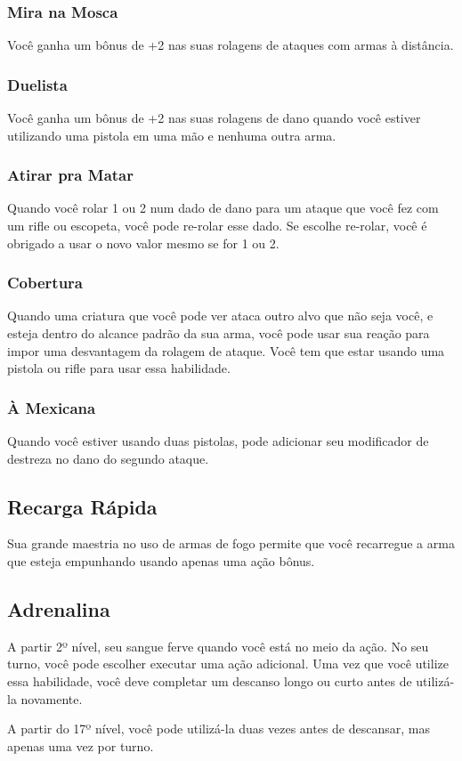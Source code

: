 \documentclass[letterpaper,twocolumn,openany]{dndbook}
\begin{document}
	\subsubsection{Mira na Mosca}
	Você ganha um bônus de +2 nas suas rolagens de ataques com armas à distância.
	
	\subsubsection{Duelista}
	Você ganha um bônus de +2 nas suas rolagens de dano quando você estiver utilizando uma pistola em uma mão e nenhuma outra arma.
	
	\subsubsection{Atirar pra Matar}
	Quando você rolar 1 ou 2 num dado de dano para um ataque que você fez com um rifle ou escopeta, você pode re-rolar esse dado. Se escolhe re-rolar, você é obrigado a usar o novo valor mesmo se for 1 ou 2.
	
	\subsubsection{Cobertura}
	Quando uma criatura que você pode ver ataca outro alvo que não seja você, e esteja dentro do alcance padrão da sua arma, você pode usar sua reação para impor uma desvantagem da rolagem de ataque. Você tem que estar usando uma pistola ou rifle para usar essa habilidade.
	
	\subsubsection{À Mexicana}
	Quando você estiver usando duas pistolas, pode adicionar seu modificador de destreza no dano do segundo ataque.
	
	\subsection{Recarga Rápida}
	Sua grande maestria no uso de armas de fogo permite que você recarregue a arma que esteja empunhando usando apenas uma ação bônus.
	
	\subsection{Adrenalina}
	A partir 2º nível, seu sangue ferve quando você está no meio da ação. No seu turno, você pode escolher executar uma ação adicional. Uma vez que você utilize essa habilidade, você deve completar um descanso longo ou curto antes de utilizá-la novamente.
	\par A partir do 17º nível, você pode utilizá-la duas vezes antes de descansar, mas apenas uma vez por turno.
	
\end{document}
